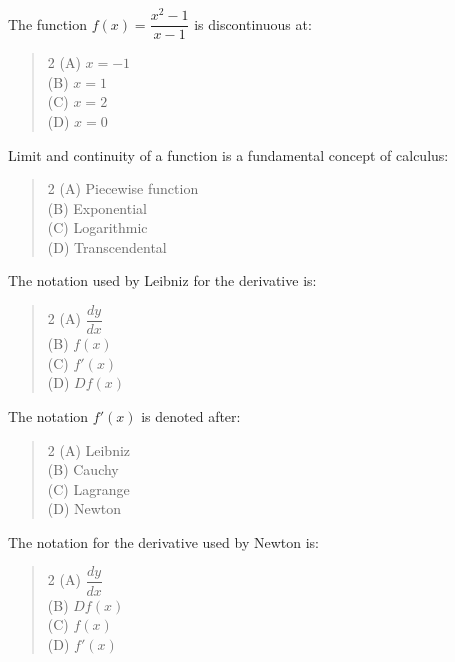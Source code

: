 \documentclass[11pt,a4paper]{article}
\begin{document}
\begin{mcqlist}
\item The function $f(x)=\dfrac{x^2-1}{x-1}$ is discontinuous at:
\begin{quote}\begin{multicols}{2}
\noindent (A) $x=-1$ \\
(B) $x=1$ \\
(C) $x=2$ \\
(D) $x=0$
\end{multicols}\end{quote}

\item Limit and continuity of a \underline{\hspace{1.5cm}} function is a fundamental concept of calculus:
\begin{quote}\begin{multicols}{2}
\noindent (A) Piecewise function \\
(B) Exponential \\
(C) Logarithmic \\
(D) Transcendental
\end{multicols}\end{quote}

\item The notation used by Leibniz for the derivative is:
\begin{quote}\begin{multicols}{2}
\noindent (A) $\dfrac{dy}{dx}$ \\
(B) $f(x)$ \\
(C) $f'(x)$ \\
(D) $Df(x)$
\end{multicols}\end{quote}

\item The notation $f'(x)$ is denoted after:
\begin{quote}\begin{multicols}{2}
\noindent (A) Leibniz \\
(B) Cauchy \\
(C) Lagrange \\
(D) Newton
\end{multicols}\end{quote}

\item The notation for the derivative used by Newton is:
\begin{quote}\begin{multicols}{2}
\noindent (A) $\dfrac{dy}{dx}$ \\
(B) $Df(x)$ \\
(C) $f(x)$ \\
(D) $f'(x)$
\end{multicols}\end{quote}


\end{mcqlist}
\end{document}
